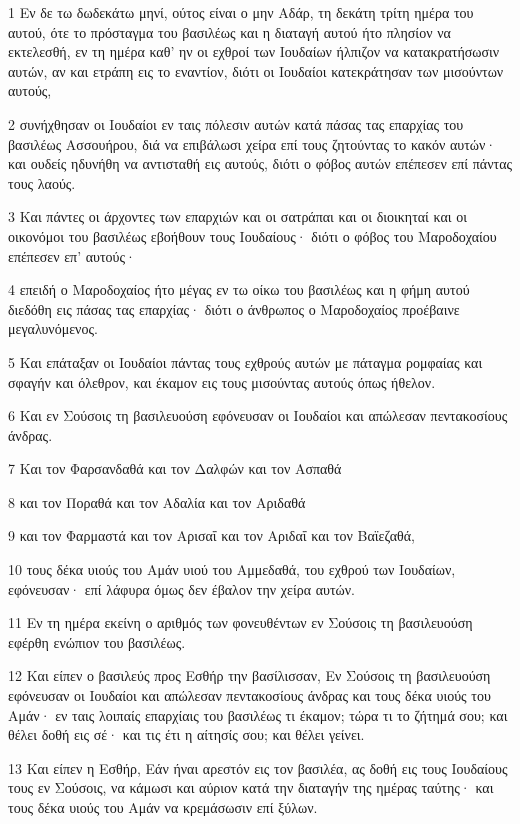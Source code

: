 \par 1 Εν δε τω δωδεκάτω μηνί, ούτος είναι ο μην Αδάρ, τη δεκάτη τρίτη ημέρα του αυτού, ότε το πρόσταγμα του βασιλέως και η διαταγή αυτού ήτο πλησίον να εκτελεσθή, εν τη ημέρα καθ' ην οι εχθροί των Ιουδαίων ήλπιζον να κατακρατήσωσιν αυτών, αν και ετράπη εις το εναντίον, διότι οι Ιουδαίοι κατεκράτησαν των μισούντων αυτούς,
\par 2 συνήχθησαν οι Ιουδαίοι εν ταις πόλεσιν αυτών κατά πάσας τας επαρχίας του βασιλέως Ασσουήρου, διά να επιβάλωσι χείρα επί τους ζητούντας το κακόν αυτών· και ουδείς ηδυνήθη να αντισταθή εις αυτούς, διότι ο φόβος αυτών επέπεσεν επί πάντας τους λαούς.
\par 3 Και πάντες οι άρχοντες των επαρχιών και οι σατράπαι και οι διοικηταί και οι οικονόμοι του βασιλέως εβοήθουν τους Ιουδαίους· διότι ο φόβος του Μαροδοχαίου επέπεσεν επ' αυτούς·
\par 4 επειδή ο Μαροδοχαίος ήτο μέγας εν τω οίκω του βασιλέως και η φήμη αυτού διεδόθη εις πάσας τας επαρχίας· διότι ο άνθρωπος ο Μαροδοχαίος προέβαινε μεγαλυνόμενος.
\par 5 Και επάταξαν οι Ιουδαίοι πάντας τους εχθρούς αυτών με πάταγμα ρομφαίας και σφαγήν και όλεθρον, και έκαμον εις τους μισούντας αυτούς όπως ήθελον.
\par 6 Και εν Σούσοις τη βασιλευούση εφόνευσαν οι Ιουδαίοι και απώλεσαν πεντακοσίους άνδρας.
\par 7 Και τον Φαρσανδαθά και τον Δαλφών και τον Ασπαθά
\par 8 και τον Ποραθά και τον Αδαλία και τον Αριδαθά
\par 9 και τον Φαρμαστά και τον Αρισαΐ και τον Αριδαΐ και τον Βαϊεζαθά,
\par 10 τους δέκα υιούς του Αμάν υιού του Αμμεδαθά, του εχθρού των Ιουδαίων, εφόνευσαν· επί λάφυρα όμως δεν έβαλον την χείρα αυτών.
\par 11 Εν τη ημέρα εκείνη ο αριθμός των φονευθέντων εν Σούσοις τη βασιλευούση εφέρθη ενώπιον του βασιλέως.
\par 12 Και είπεν ο βασιλεύς προς Εσθήρ την βασίλισσαν, Εν Σούσοις τη βασιλευούση εφόνευσαν οι Ιουδαίοι και απώλεσαν πεντακοσίους άνδρας και τους δέκα υιούς του Αμάν· εν ταις λοιπαίς επαρχίαις του βασιλέως τι έκαμον; τώρα τι το ζήτημά σου; και θέλει δοθή εις σέ· και τις έτι η αίτησίς σου; και θέλει γείνει.
\par 13 Και είπεν η Εσθήρ, Εάν ήναι αρεστόν εις τον βασιλέα, ας δοθή εις τους Ιουδαίους τους εν Σούσοις, να κάμωσι και αύριον κατά την διαταγήν της ημέρας ταύτης· και τους δέκα υιούς του Αμάν να κρεμάσωσιν επί ξύλων.
